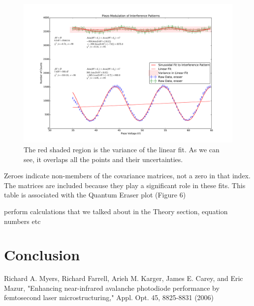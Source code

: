 \documentclass{article}
\begin{document}
\begin{figure}[!htb]
	\centering
	\includegraphics[scale=.525]{../plots/eraser}
	\caption{The red shaded region is the variance of the linear fit.  As we can see, it overlaps all the points and their uncertainties.}
\end{figure}

\begin{table}[!htb]
	\centering
   		\caption{Zeroes indicate non-members of the covariance matrices, not a zero in that index.  The matrices are included because they play a significant role in these fits.  This table is associated with the Quantum Eraser plot (Figure 6)}
\end{table}

perform calculations that we talked about in the Theory section, equation numbers etc

\section{Conclusion}

\begin{thebibliography}{10}
		Richard A. Myers, Richard Farrell, Arieh M. Karger, James E. Carey, and Eric Mazur, "Enhancing near-infrared avalanche photodiode performance by femtosecond laser microstructuring," Appl. Opt. 45, 8825-8831 (2006)

\end{thebibliography}
\end{document}
